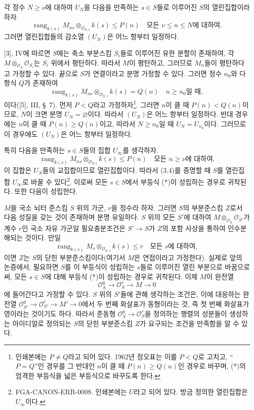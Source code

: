 각 정수 $N\geq\nu$에 대하여 $U_N$을 다음을
만족하는 $s\in S$들로 이루어진 $S$의 열린집합이라 하자.
\[
\operatorname{rang}_{k(s)}
M_{ns}\otimes_{\mathcal O_{S,s}}k(s)\leq P(n)
\quad\text{모든 $\nu\leq n\leq N$에 대하여}.
\]
그러면 열린집합들의 감소열 $(U_N)$은 어느 항부터 일정하다.

[3], IV에 따르면 $S$에는 축소 부분스킴 $S_i$들로 이루어진 유한 분할이
존재하여, 각 $M\otimes_{\mathcal O_S}\mathcal O_{S_i}$는 $S_i$ 위에서
평탄하다. 따라서 $M$이 평탄하고, 그러므로 $M_n$들이 평탄하다고 가정할
수 있다. 끝으로 $S$가 연결이라고 분명 가정할 수 있다. 그러면 정수
$n_0$와 다항식 $Q$가 존재하여
\[
\operatorname{rang}_{k(s)}
M_{ns}\otimes_{\mathcal O_{S,s}}k(s)=Q(n)
\quad\text{$n\geq n_0$일 때},
\]
이다([5], III, \S~7). 먼저 $P<Q$라고 가정하자\footnote{인쇄본에는
$P\neq Q$라고 되어 있다. 1962년 정오표는 이를 $P<Q$로 고치고,
``$P=Q$''인 경우를 그 반대인 $n$이 클 때 $P(n)\geq Q(n)$인 경우로
바꾸며, (*)의 엄격한 부등식을 넓은 부등식으로 바꾸도록 한다.}. 그러면
$n$이 클 때 $P(n)<Q(n)$이므로, $N$이 크면 분명
$U_N=\varnothing$이다. 따라서 $(U_N)$은 어느 항부터 일정하다. 반대
경우에는 $n$이 클 때 $P(n)\geq Q(n)$이고, 따라서 $N\geq n_0$일 때
$U_N=U_{n_0}$이다. 그러므로 이 경우에도 $(U_N)$은 어느 항부터 일정하다.

특히 다음을 만족하는 $s\in S$들의 집합 $U_\infty$를 생각하자.
\[
\tag{*}
\operatorname{rang}_{k(s)}
M_{ns}\otimes_{\mathcal O_{S,s}}k(s)\leq P(n)
\quad\text{모든 $n\geq\nu$에 대하여}.
\]
이 집합은 $U_N$들의 교집합이므로 열린집합이다. 따라서 (3.4)를 증명할
때 $S$를 열린집합 $U_\infty$로 바꿀 수 있다\footnote{FGA-CANON-ERR-0008.
인쇄본에는 $U$라고 되어 있다. 방금 정의한 열린집합은 $U_\infty$이다.}.
이로써 모든 $s\in S$에서 부등식 (*)이 성립하는 경우로 귀착된다. 또한
다음이 성립한다.

 $M$을 국소 뇌터 준스킴 $S$ 위의 가군, $r$을
정수라 하자. 그러면 $S$의 부분준스킴 $Z$로서 다음 성질을 갖는 것이
존재하며 분명 유일하다. $S$ 위의 모든 $S'$에 대하여
$M\otimes_{\mathcal O_S}\mathcal O_{S'}$가 계수 $r$인 국소 자유 가군일
필요충분조건은 $S'\longrightarrow S$가 $Z$의 포함 사상을 통하여
인수분해되는 것이다. 만일
\[
\operatorname{rang}_{k(s)}
M_s\otimes_{\mathcal O_{S,s}}k(s)\leq r
\quad\text{모든 $s$에 대하여},
\]
이면 $Z$는 $S$의 닫힌 부분준스킴이다(여기서 $M$은 연접이라고
가정한다).
실제로 앞의 논증에서, 필요하면 $S$를 이 부등식이 성립하는 $s$들로
이루어진 열린 부분으로 바꿈으로써, 모든 $s\in S$에 대해 부등식 (*)이
성립하는 경우로 귀착된다. 이제 $M$이 완전열
\[
\mathcal O_S^q\longrightarrow\mathcal O_S^r\longrightarrow M\longrightarrow0
\]
에 들어간다고 가정할 수 있다. $S$ 위의 $S'$들에 관해 생각하는 조건은,
이에 대응하는 완전열
$\mathcal O_{S'}^q\longrightarrow\mathcal O_{S'}^r
\longrightarrow M'\longrightarrow0$에서 두 번째 화살표가 동형이라는 것,
즉 첫 번째 화살표가 영이라는 것이기도 하다. 따라서 준동형
$\mathcal O_S^q\longrightarrow\mathcal O_S^r$을 정의하는 행렬의 성분들이
생성하는 아이디얼로 정의되는 $S$의 닫힌 부분준스킴 $Z$가 요구되는
조건을 만족함을 알 수 있다.

